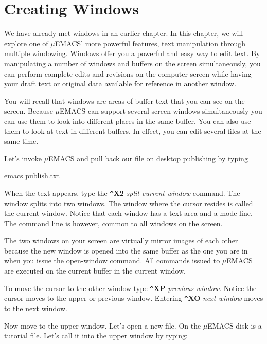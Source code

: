 \section{Creating Windows}

We have already met windows in an earlier chapter. In this chapter, we
will explore one of $\mu$EMACS' more powerful features, text
manipulation through multiple windowing. Windows offer you a powerful
and easy way to edit text. By manipulating a number of windows and
buffers on the screen simultaneously, you can perform complete edits
and revisions on the computer screen while having your draft text or
original data available for reference in another window.

You will recall that windows are areas of buffer text that you can see
on the screen. Because $\mu$EMACS can support several screen windows
simultaneously you can use them to look into different places in the
same buffer. You can also use them to look at text in different
buffers. In effect, you can edit several files at the same time.

Let's invoke $\mu$EMACS and pull back our file on desktop publishing by
typing

emacs publish.txt

When the text appears, type the {\bf \verb+^+X2} {\it
split-current-window} command. The window splits into two windows. The
window where the cursor resides is called the current window. Notice
that each window has a text area and a mode line. The command line is
however, common to all windows on the screen.

The two windows on your screen are virtually mirror images of each
other because the new window is opened into the same buffer as the one
you are in when you issue the open-window command. All commands issued
to $\mu$EMACS are executed on the current buffer in the current window.

To move the cursor to the other window type {\bf \verb+^+XP} {\it
previous-window}. Notice the cursor moves to the upper or previous
window. Entering {\bf \verb+^+XO} {\it next-window} moves to the next
window.

Now move to the upper window. Let's open a new file. On the $\mu$EMACS disk
is a tutorial file. Let's call it into the upper window by typing:

